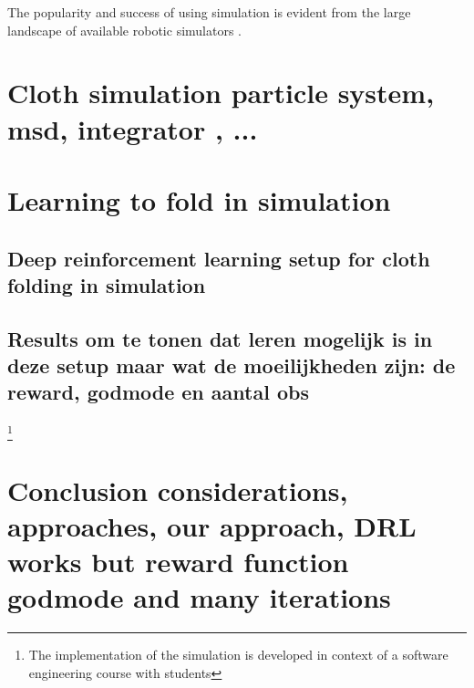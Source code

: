 \documentclass[\home/main.tex]{subfiles}
\begin{document}
The popularity and success of using simulation is evident from the large landscape of available robotic simulators \autocite{Collins2021}. 


\section{Cloth simulation \tiny{particle system, msd, integrator , ...} }




\section{Learning to fold in simulation}
\subsection{Deep reinforcement learning setup for cloth folding in simulation}
\subsection{Results \tiny{om te tonen dat leren mogelijk is in deze setup maar wat de moeilijkheden zijn: de reward, godmode en aantal obs}}

\footnote{The implementation of the simulation is developed in context of a software engineering course with students }


\section{Conclusion {\tiny considerations, approaches, our approach, DRL works but reward function godmode and many iterations}}
\end{document}
